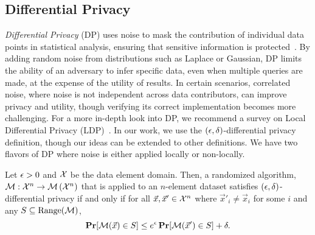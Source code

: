 \subsection{Differential Privacy}
\emph{Differential Privacy} (DP) uses noise to mask the contribution of individual data points in statistical analysis, ensuring that sensitive information is protected~\cite{dwork2006differential}. 
By adding random noise from distributions such as Laplace or Gaussian, DP limits the ability of an adversary to infer specific data, even when multiple queries are made, at the expense of the utility of results. 
In certain scenarios, correlated noise, where noise is not independent across data contributors, can improve privacy and utility, though verifying its correct implementation becomes more challenging.
For a more in-depth look into DP, we recommend a survey on Local Differential Privacy (LDP)~\cite{yang2023local}.
In our work, we use the $(\epsilon, \delta)$-differential privacy definition, though our ideas can be extended to other definitions.
We have two flavors of DP where noise is either applied locally or non-locally.

\begin{definition}
	Let $\epsilon > 0$ and $\mathcal{X}$ be the data element domain.
	Then, a randomized algorithm, $\mathcal{M} : \mathcal{X}^n \rightarrow \mathcal{M}\left(\mathcal{X}^n\right)$ that is applied to an $n$-element dataset satisfies $(\epsilon, \delta)$-differential privacy if and only if for all $\vec{x},\vec{x}' \in \mathcal{X}^n$ where $\vec{x}'_i \neq \vec{x}_i$ for some $i$ and any $S \subseteq \text{Range}(\mathcal{M})$,
	\[
		\operatorname*{\mathbf{Pr}}[\mathcal{M}(\vec{x}) \in S] \leq e^\epsilon \operatorname*{\mathbf{Pr}}[\mathcal{M}(\vec{x}') \in S] + \delta.
	\]
\end{definition}



